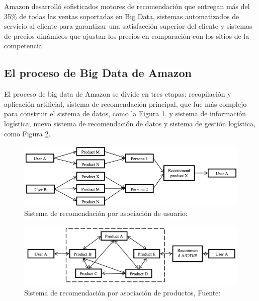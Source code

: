 Amazon desarrolló sofisticados motores de recomendación que entregan más del 35\% de todas las ventas soportadas en Big Data, sistemas automatizados de servicio al cliente para garantizar una satisfacción superior del cliente y sistemas de precios dinámicos que ajustan los precios en comparación con los sitios de la competencia 

\subsection{El proceso de Big Data de Amazon}

El proceso de big data  de Amazon se divide en tres etapas: recopilación y aplicación artificial, sistema de recomendación principal, que fue más complejo para construir el sistema de datos, como la Figura \ref{fig:4}. y sistema de información logística, nuevo sistema de recomendación de datos y sistema de gestión logística, como Figura \ref{fig:5}.

\begin{figure}[h]
	\centering
	\includegraphics[scale=.5] {img/recomendation-system}
	\caption{Sistema de recomendación por asociación de usuario: }
	\label{fig:4}	
\end{figure}

\begin{figure}[h]
	\centering
	\includegraphics[scale=.3] {img/asocacion_productos}
	\caption{Sistema de recomendación por asociación de productos, Fuente: }
	\label{fig:5}	
\end{figure}



